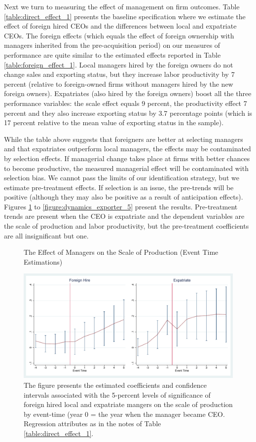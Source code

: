 \documentclass[12pt,a4paper]{article}
\begin{document}
Next we turn to measuring the effect of management on firm outcomes. Table \ref{table:direct_effect_1} presents the baseline specification where we estimate the effect of foreign hired CEOs and the differences between local and expatriate CEOs. The foreign effects (which equals the effect of foreign ownership with managers inherited from the pre-acquisition period) on our measures of performance are quite similar to the estimated effects reported in Table \ref{table:foreign_effect_1}. Local managers hired by the foreign owners do not change sales and exporting status, but they increase labor productivity by 7 percent (relative to foreign-owned firms without managers hired by the new foreign owners). Expatriates (also hired by the foreign owners) boost all the three performance variables: the scale effect equals 9 percent, the productivity effect 7 percent and they also increase exporting status by 3.7 percentage points (which is 17 percent relative to the mean value of exporting status in the sample).

While the table above suggests that foreigners are better at selecting managers and that expatriates outperform local managers, the effects may be contaminated by selection effects. If managerial change takes place at firms with better chances to become productive, the measured managerial effect will be contaminated with selection bias. We cannot pass the limits of our identification strategy, but we estimate pre-treatment effects. If selection is an issue, the pre-trends will be positive (although they may also be positive as a result of anticipation effects). Figures \ref{figure:dynamics_lnQ} to \ref{figure:dynamics_exporter_5} present the results. Pre-treatment trends are present when the CEO is expatriate and the dependent variables are the scale of production and labor productivity, but the pre-treatment coefficients are all insignificant but one. 

\begin{figure}
\caption{The Effect of Managers on the Scale of Production (Event Time Estimations)}
\label{figure:dynamics_lnQ}
\center
\includegraphics[width=15cm]{Regression/gr_lnQ.pdf}
\caption*{The figure presents the estimated coefficients and confidence intervals associated with the 5-percent levels of significance of foreign hired local and expatriate mangers on the scale of production by event-time (year 0 = the year when the manager became CEO. Regression attributes as in the notes of Table \ref{table:direct_effect_1}.}
\end{figure}
\end{document}
